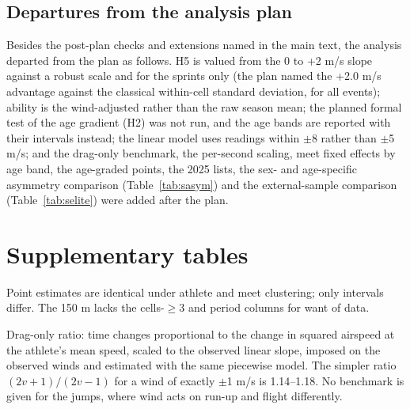\documentclass[12pt,a4paper]{article}
\begin{document}
\subsection*{Departures from the analysis plan}

Besides the post-plan checks and extensions named in the main text, the analysis departed from the plan as follows. H5 is valued from the 0 to +2 m/s slope against a robust scale and for the sprints only (the plan named the +2.0 m/s advantage against the classical within-cell standard deviation, for all events); ability is the wind-adjusted rather than the raw season mean; the planned formal test of the age gradient (H2) was not run, and the age bands are reported with their intervals instead; the linear model uses readings within $\pm$8 rather than $\pm$5 m/s; and the drag-only benchmark, the per-second scaling, meet fixed effects by age band, the age-graded points, the 2025 lists, the sex- and age-specific asymmetry comparison (Table~\ref{tab:sasym}) and the external-sample comparison (Table~\ref{tab:selite}) were added after the plan.

\clearpage
\section*{Supplementary tables}

\begin{table}[H]
\centering
\caption{Robustness: gain per +1 m/s under alternative specifications (point estimates; s for sprints, cm for jumps).}
\label{tab:srobust}
\footnotesize
\resizebox{\textwidth}{!}{}
\vspace{0.2em}
\parbox{0.97\textwidth}{\footnotesize Point estimates are identical under athlete and meet clustering; only intervals differ. The 150 m lacks the cells-$\geq$3 and period columns for want of data.}
\end{table}

\begin{table}[H]
\centering
\caption{Asymmetry: separate tail- and headwind slopes, observed head/tail ratio, and the ratio drag-only physics predicts for the same estimator (95\,\% CIs clustered on meet).}
\label{tab:asym}
\footnotesize
\resizebox{\textwidth}{!}{}
\vspace{0.2em}
\parbox{0.97\textwidth}{\footnotesize Drag-only ratio: time changes proportional to the change in squared airspeed at the athlete's mean speed, scaled to the observed linear slope, imposed on the observed winds and estimated with the same piecewise model. The simpler ratio $(2v+1)/(2v-1)$ for a wind of exactly $\pm$1 m/s is 1.14--1.18. No benchmark is given for the jumps, where wind acts on run-up and flight differently.}
\end{table}
\end{document}

